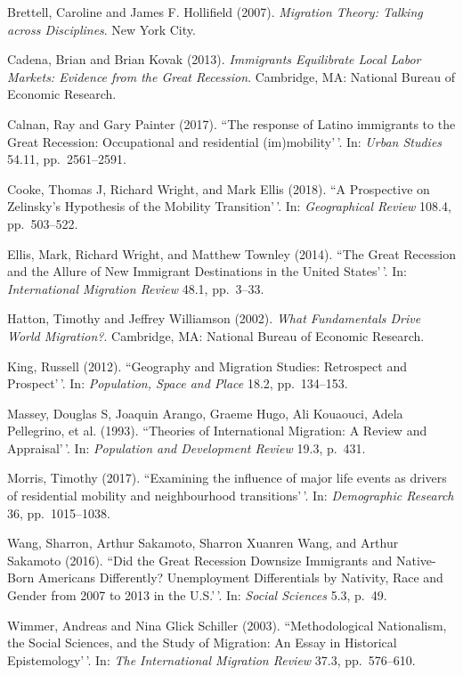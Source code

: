 \documentclass[11pt,]{article}
\begin{document}
Brettell, Caroline and James F. Hollifield (2007).
\emph{Migration Theory: Talking across Disciplines}. New York City.

Cadena, Brian and Brian Kovak (2013).
\emph{Immigrants Equilibrate Local Labor Markets: Evidence from the Great Recession}.
Cambridge, MA: National Bureau of Economic Research.

Calnan, Ray and Gary Painter (2017). ``The response of Latino immigrants
to the Great Recession: Occupational and residential (im)mobility'\,'.
In: \emph{Urban Studies} 54.11, pp.~2561--2591.

Cooke, Thomas J, Richard Wright, and Mark Ellis (2018). ``A Prospective
on Zelinsky's Hypothesis of the Mobility Transition'\,'. In:
\emph{Geographical Review} 108.4, pp.~503--522.

Ellis, Mark, Richard Wright, and Matthew Townley (2014). ``The Great
Recession and the Allure of New Immigrant Destinations in the United
States'\,'. In: \emph{International Migration Review} 48.1, pp.~3--33.

Hatton, Timothy and Jeffrey Williamson (2002).
\emph{What Fundamentals Drive World Migration?}. Cambridge, MA: National
Bureau of Economic Research.

King, Russell (2012). ``Geography and Migration Studies: Retrospect and
Prospect'\,'. In: \emph{Population, Space and Place} 18.2, pp.~134--153.

Massey, Douglas S, Joaquin Arango, Graeme Hugo, Ali Kouaouci, Adela
Pellegrino, et al. (1993). ``Theories of International Migration: A
Review and Appraisal'\,'. In: \emph{Population and Development Review}
19.3, p.~431.

Morris, Timothy (2017). ``Examining the influence of major life events
as drivers of residential mobility and neighbourhood transitions'\,'.
In: \emph{Demographic Research} 36, pp.~1015--1038.

Wang, Sharron, Arthur Sakamoto, Sharron Xuanren Wang, and Arthur
Sakamoto (2016). ``Did the Great Recession Downsize Immigrants and
Native-Born Americans Differently? Unemployment Differentials by
Nativity, Race and Gender from 2007 to 2013 in the U.S.'\,'. In:
\emph{Social Sciences} 5.3, p.~49.

Wimmer, Andreas and Nina Glick Schiller (2003). ``Methodological
Nationalism, the Social Sciences, and the Study of Migration: An Essay
in Historical Epistemology'\,'. In:
\emph{The International Migration Review} 37.3, pp.~576--610.
\end{document}
